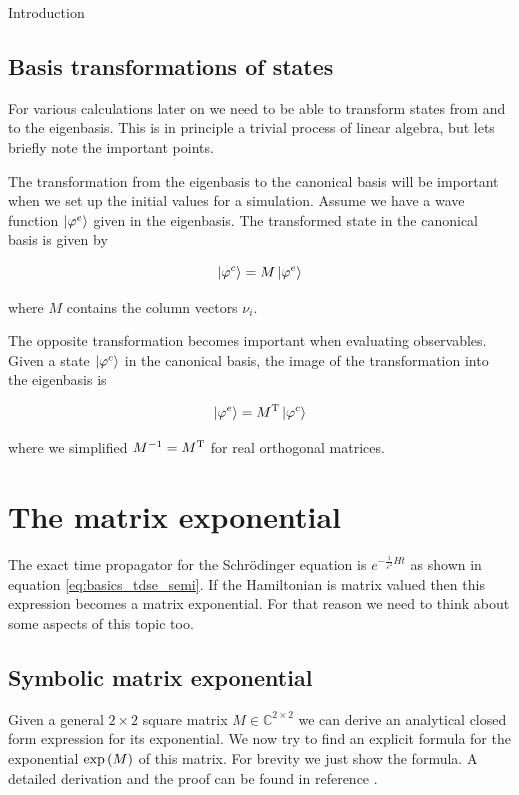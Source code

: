 \begin{chapter}{Introduction}
\subsection{Basis transformations of states}
\label{sec:basis_transformations_of_states}

For various calculations later on we need to be able to transform states from and to
the eigenbasis. This is in principle a trivial process of linear algebra, but lets
briefly note the important points.

The transformation from the eigenbasis to the canonical basis will be important
when we set up the initial values for a simulation. Assume we have a wave function
$\Ket{\varphi^e}$ given in the eigenbasis. The transformed state in the canonical
basis is given by

\begin{equation}
  \Ket{\varphi^c} = M \Ket{\varphi^e}
\end{equation}

where $M$ contains the column vectors $\nu_i$.

The opposite transformation becomes important when evaluating observables. Given
a state $\Ket{\varphi^c}$ in the canonical basis, the image of the transformation
into the eigenbasis is

\begin{equation}
  \Ket{\varphi^e} = M{}^{\textnormal{T}} \Ket{\varphi^c}
\end{equation}

where we simplified $M^{-1} = M{}^{\textnormal{T}}$ for real orthogonal matrices.

\section{The matrix exponential}

The exact time propagator for the Schrödinger equation is $e^{- \frac{i}{\varepsilon^2} H t }$
as shown in equation \eqref{eq:basics_tdse_semi}. If the Hamiltonian is matrix valued
then this expression becomes a matrix exponential. For that reason we need to
think about some aspects of this topic too.

\subsection{Symbolic matrix exponential}

Given a general $2 \times 2$ square matrix $M \in \mathbb{C}^{2 \times 2}$ we can derive
an analytical closed form expression for its exponential. We now try to find an
explicit formula for the exponential $\exp\left( M \right)$ of this matrix. For brevity
we just show the formula. A detailed derivation and the proof can be found in
reference \cite{matexp}.


\end{chapter}
